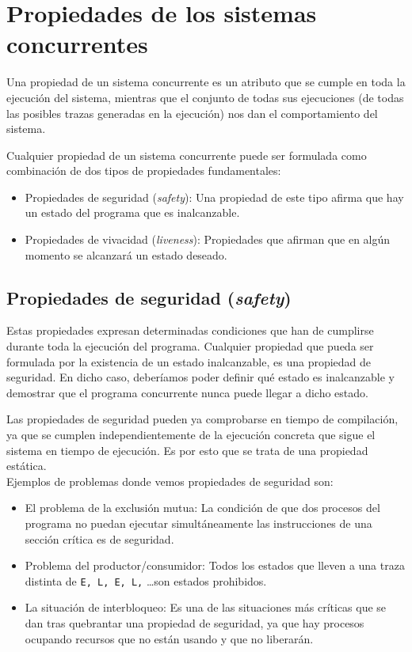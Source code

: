 \section{Propiedades de los sistemas concurrentes}
Una propiedad de un sistema concurrente es un atributo que se cumple en toda la ejecución del sistema, mientras que el conjunto de todas sus ejecuciones (de todas las posibles trazas generadas en la ejecución) nos dan el comportamiento del sistema.

Cualquier propiedad de un sistema concurrente puede ser formulada como combinación de dos tipos de propiedades fundamentales:

\begin{itemize}
    \item Propiedades de seguridad (\textit{safety}): Una propiedad de este tipo afirma que hay un estado del programa que es inalcanzable.
    \item Propiedades de vivacidad (\textit{liveness}): Propiedades que afirman que en algún momento se alcanzará un estado deseado.
\end{itemize}

\subsection{Propiedades de seguridad (\textit{safety})}
Estas propiedades expresan determinadas condiciones que han de cumplirse durante toda la ejecución del programa. Cualquier propiedad que pueda ser formulada por la existencia de un estado inalcanzable, es una propiedad de seguridad. En dicho caso, deberíamos poder definir qué estado es inalcanzable y demostrar que el programa concurrente nunca puede llegar a dicho estado.

Las propiedades de seguridad pueden ya comprobarse en tiempo de compilación, ya que se cumplen independientemente de la ejecución concreta que sigue el sistema en tiempo de ejecución. Es por esto que se trata de una propiedad estática.\\

Ejemplos de problemas donde vemos propiedades de seguridad son:
\begin{itemize}
    \item El problema de la exclusión mutua: La condición de que dos procesos del programa no puedan ejecutar simultáneamente las instrucciones de una sección crítica es de seguridad.
    \item Problema del productor/consumidor: Todos los estados que lleven a una traza distinta de \verb|E, L, E, L,| \ldots son estados prohibidos.
    \item La situación de interbloqueo: Es una de las situaciones más críticas que se dan tras quebrantar una propiedad de seguridad, ya que hay procesos ocupando recursos que no están usando y que no liberarán.
\end{itemize}

